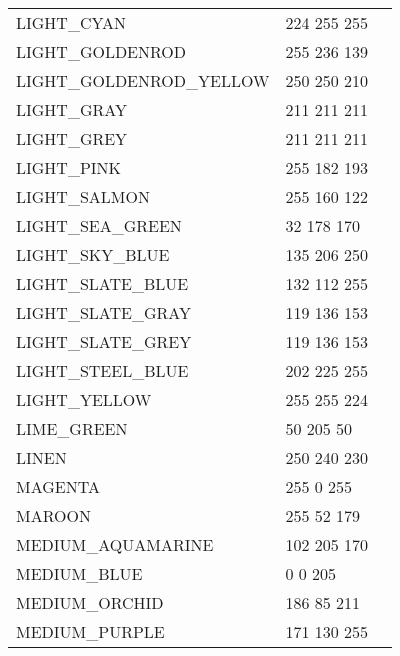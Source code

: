 \begin{longtable}{l|l|l}
LIGHT\_CYAN & 224 255 255 & \colorbox[RGB]{224 255 255}{\phantom{MMMMMMMM}}\\
LIGHT\_GOLDENROD & 255 236 139 & \colorbox[RGB]{255 236 139}{\phantom{MMMMMMMM}}\\
LIGHT\_GOLDENROD\_YELLOW & 250 250 210 & \colorbox[RGB]{250 250 210}{\phantom{MMMMMMMM}}\\
LIGHT\_GRAY & 211 211 211 & \colorbox[RGB]{211 211 211}{\phantom{MMMMMMMM}}\\
LIGHT\_GREY & 211 211 211 & \colorbox[RGB]{211 211 211}{\phantom{MMMMMMMM}}\\
LIGHT\_PINK & 255 182 193 & \colorbox[RGB]{255 182 193}{\phantom{MMMMMMMM}}\\
LIGHT\_SALMON & 255 160 122 & \colorbox[RGB]{255 160 122}{\phantom{MMMMMMMM}}\\
LIGHT\_SEA\_GREEN & 32 178 170 & \colorbox[RGB]{32 178 170}{\phantom{MMMMMMMM}}\\
LIGHT\_SKY\_BLUE & 135 206 250 & \colorbox[RGB]{135 206 250}{\phantom{MMMMMMMM}}\\
LIGHT\_SLATE\_BLUE & 132 112 255 & \colorbox[RGB]{132 112 255}{\phantom{MMMMMMMM}}\\
LIGHT\_SLATE\_GRAY & 119 136 153 & \colorbox[RGB]{119 136 153}{\phantom{MMMMMMMM}}\\
LIGHT\_SLATE\_GREY & 119 136 153 & \colorbox[RGB]{119 136 153}{\phantom{MMMMMMMM}}\\
LIGHT\_STEEL\_BLUE & 202 225 255 & \colorbox[RGB]{202 225 255}{\phantom{MMMMMMMM}}\\
LIGHT\_YELLOW & 255 255 224 & \colorbox[RGB]{255 255 224}{\phantom{MMMMMMMM}}\\
LIME\_GREEN & 50 205 50 & \colorbox[RGB]{50 205 50}{\phantom{MMMMMMMM}}\\
LINEN & 250 240 230 & \colorbox[RGB]{250 240 230}{\phantom{MMMMMMMM}}\\
MAGENTA & 255 0 255 & \colorbox[RGB]{255 0 255}{\phantom{MMMMMMMM}}\\
MAROON & 255 52 179 & \colorbox[RGB]{255 52 179}{\phantom{MMMMMMMM}}\\
MEDIUM\_AQUAMARINE & 102 205 170 & \colorbox[RGB]{102 205 170}{\phantom{MMMMMMMM}}\\
MEDIUM\_BLUE & 0 0 205 & \colorbox[RGB]{0 0 205}{\phantom{MMMMMMMM}}\\
MEDIUM\_ORCHID & 186 85 211 & \colorbox[RGB]{186 85 211}{\phantom{MMMMMMMM}}\\
MEDIUM\_PURPLE & 171 130 255 & \colorbox[RGB]{171 130 255}{\phantom{MMMMMMMM}}\\

\end{longtable}
